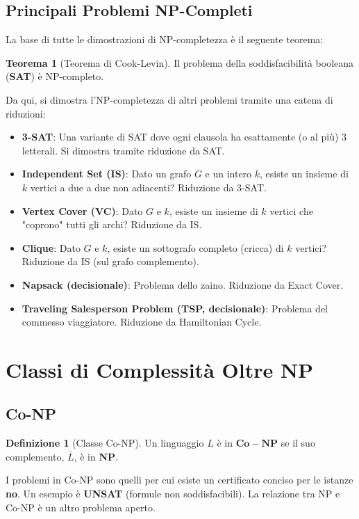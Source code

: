 \documentclass[a4paper]{article}
\theoremstyle{definition} %
\newtheorem{theorem}{Teorema}
\newtheorem{definition}{Definizione}
\begin{document}
\subsection{Principali Problemi NP-Completi}
La base di tutte le dimostrazioni di NP-completezza è il seguente teorema:
\begin{theorem}[Teorema di Cook-Levin]
Il problema della soddisfacibilità booleana (\textbf{SAT}) è NP-completo.
\end{theorem}
Da qui, si dimostra l'NP-completezza di altri problemi tramite una catena di riduzioni:
\begin{itemize}
    \item \textbf{3-SAT}: Una variante di SAT dove ogni clausola ha esattamente (o al più) 3 letterali. Si dimostra tramite riduzione da SAT.
    \item \textbf{Independent Set (IS)}: Dato un grafo $G$ e un intero $k$, esiste un insieme di $k$ vertici a due a due non adiacenti? Riduzione da 3-SAT.
    \item \textbf{Vertex Cover (VC)}: Dato $G$ e $k$, esiste un insieme di $k$ vertici che "coprono" tutti gli archi? Riduzione da IS.
    \item \textbf{Clique}: Dato $G$ e $k$, esiste un sottografo completo (cricca) di $k$ vertici? Riduzione da IS (sul grafo complemento).
    \item \textbf{Napsack (decisionale)}: Problema dello zaino. Riduzione da Exact Cover.
    \item \textbf{Traveling Salesperson Problem (TSP, decisionale)}: Problema del commesso viaggiatore. Riduzione da Hamiltonian Cycle.
\end{itemize}

\section{Classi di Complessità Oltre NP}
\subsection{Co-NP}
\begin{definition}[Classe Co-NP]
Un linguaggio $L$ è in $\mathbf{Co-NP}$ se il suo complemento, $\bar{L}$, è in $\mathbf{NP}$.
\end{definition}
I problemi in Co-NP sono quelli per cui esiste un certificato conciso per le istanze \textbf{no}. Un esempio è \textbf{UNSAT} (formule non soddisfacibili). La relazione tra NP e Co-NP è un altro problema aperto.
\end{document}
